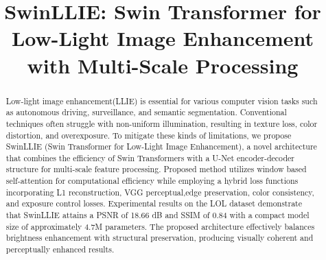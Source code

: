 \documentclass[sigconf]{acmart}
\begin{document}
\title{SwinLLIE: Swin Transformer for Low-Light Image Enhancement with Multi-Scale Processing}



\renewcommand{\shortauthors}{}

\begin{abstract}
Low-light image enhancement(LLIE) is essential for various computer vision tasks such as autonomous driving, surveillance, and semantic segmentation. Conventional techniques often struggle with non-uniform illumination, resulting in texture loss, color distortion, and overexposure. To mitigate these kinds of limitations, we propose SwinLLIE (Swin Transformer for Low-Light Image Enhancement), a novel architecture that combines the efficiency of Swin Transformers with a U-Net encoder-decoder structure for multi-scale feature processing. Proposed method utilizes window based self-attention for computational efficiency while employing a hybrid loss functions incorporating L1 reconstruction, VGG perceptual,edge preservation, color consistency, and exposure control losses. Experimental results on the LOL dataset demonstrate that SwinLLIE attains a PSNR of 18.66 dB and SSIM of 0.84 with a compact model size of approximately 4.7M parameters. The proposed architecture effectively balances brightness enhancement with structural preservation, producing visually coherent and perceptually enhanced results.
\end{abstract}


\maketitle
\end{document}
